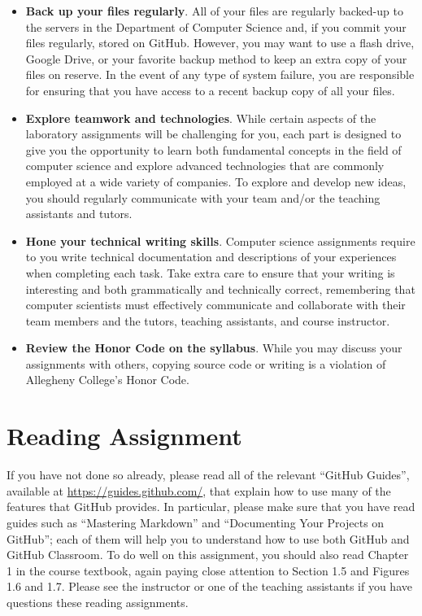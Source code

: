 \documentclass[11pt]{article}
\begin{document}
\begin{itemize}
\item {\bf Back up your files regularly}. All of your files are regularly
  backed-up to the servers in the Department of Computer Science and, if you
  commit your files regularly, stored on GitHub. However, you may want to use a
  flash drive, Google Drive, or your favorite backup method to keep an extra
  copy of your files on reserve. In the event of any type of system failure, you
  are responsible for ensuring that you have access to a recent backup copy of
  all your files.

\item {\bf Explore teamwork and technologies}. While certain aspects of the
  laboratory assignments will be challenging for you, each part is designed to
  give you the opportunity to learn both fundamental concepts in the field of
  computer science and explore advanced technologies that are commonly employed
  at a wide variety of companies. To explore and develop new ideas, you should
  regularly communicate with your team and/or the teaching assistants and
  tutors.

\item {\bf Hone your technical writing skills}. Computer science assignments
  require to you write technical documentation and descriptions of your
  experiences when completing each task. Take extra care to ensure that your
  writing is interesting and both grammatically and technically correct,
  remembering that computer scientists must effectively communicate and
  collaborate with their team members and the tutors, teaching assistants, and
  course instructor.

\item {\bf Review the Honor Code on the syllabus}. While you may discuss your
  assignments with others, copying source code or writing is a violation of
  Allegheny College's Honor Code.

\end{itemize}

\section*{Reading Assignment}

If you have not done so already, please read all of the relevant ``GitHub
Guides'', available at \url{https://guides.github.com/}, that explain how to use
many of the features that GitHub provides. In particular, please make sure that
you have read guides such as ``Mastering Markdown'' and ``Documenting Your
Projects on GitHub''; each of them will help you to understand how to use both
GitHub and GitHub Classroom. To do well on this assignment, you should also read
Chapter 1 in the course textbook, again paying close attention to Section 1.5
and Figures 1.6 and 1.7. Please see the instructor or one of the teaching
assistants if you have questions these reading assignments.
\end{document}
